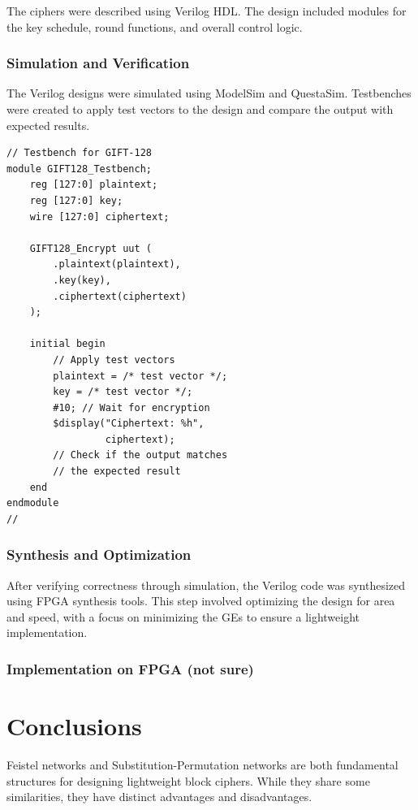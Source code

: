 \documentclass[conference]{IEEEtran}
\begin{document}
The ciphers were described using Verilog HDL. The design included modules for the key schedule, round functions, and overall control logic.

\subsubsection{Simulation and Verification}

The Verilog designs were simulated using ModelSim and QuestaSim. Testbenches were created to apply test vectors to the design and compare the output with expected results.

\begin{verbatim}
// Testbench for GIFT-128
module GIFT128_Testbench;
    reg [127:0] plaintext;
    reg [127:0] key;
    wire [127:0] ciphertext;

    GIFT128_Encrypt uut (
        .plaintext(plaintext),
        .key(key),
        .ciphertext(ciphertext)
    );

    initial begin
        // Apply test vectors
        plaintext = /* test vector */;
        key = /* test vector */;
        #10; // Wait for encryption 
        $display("Ciphertext: %h",
                 ciphertext);
        // Check if the output matches 
        // the expected result
    end
endmodule
//
\end{verbatim}

\subsubsection{Synthesis and Optimization}

After verifying correctness through simulation, the Verilog code was synthesized using FPGA synthesis tools. This step involved optimizing the design for area and speed, with a focus on minimizing the GEs to ensure a lightweight implementation.


\subsubsection{Implementation on FPGA (not sure)}


\section{Conclusions}
Feistel networks and Substitution-Permutation networks are both fundamental structures for designing lightweight block ciphers. While they share some similarities, they have distinct advantages and disadvantages.
\end{document}
